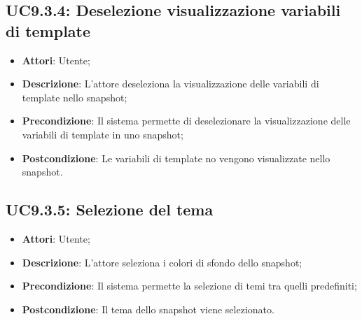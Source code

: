 \subsection{UC9.3.4: Deselezione visualizzazione variabili di template}
\begin{itemize}
	\item \textbf{Attori}: Utente;
	\item \textbf{Descrizione}: L'attore deseleziona la visualizzazione delle variabili di template nello snapshot;
	\item \textbf{Precondizione}: Il sistema permette di deselezionare la visualizzazione delle variabili di template in uno snapshot;
	\item \textbf{Postcondizione}: Le variabili di template no vengono visualizzate nello snapshot.
\end{itemize}

\subsection{UC9.3.5: Selezione del tema}
\begin{itemize}
	\item \textbf{Attori}: Utente;
	\item \textbf{Descrizione}: L'attore seleziona i colori di sfondo dello snapshot; 
	\item \textbf{Precondizione}: Il sistema permette la selezione di temi tra quelli predefiniti;
	\item \textbf{Postcondizione}: Il tema dello snapshot viene selezionato.
\end{itemize}
